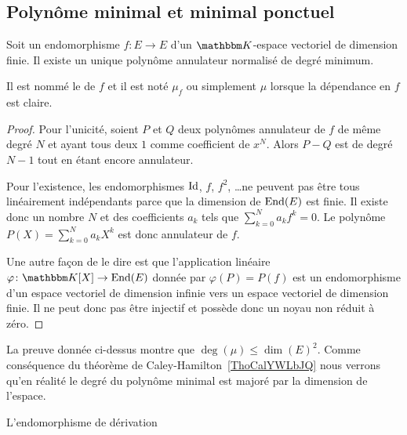 \subsection{Polynôme minimal et minimal ponctuel}

\begin{lemmaDef}        \label{DefooOHUXooNkPWaB}
    Soit un endomorphisme \( f\colon E\to E\) d'un \( \eK\)-espace vectoriel de dimension finie. Il existe un unique polynôme annulateur normalisé de degré minimum.

    Il est nommé le  de \( f\) et il est noté \( \mu_f\) ou simplement \( \mu\) lorsque la dépendance en \( f\) est claire.
\end{lemmaDef}

\begin{proof}
    Pour l'unicité, soient \( P\) et \( Q\) deux polynômes annulateur de \( f\) de même degré \( N\) et ayant tous deux \( 1\) comme coefficient de \( x^N\). Alors \( P-Q\) est de degré \( N-1\) tout en étant encore annulateur.

    Pour l'existence, les endomorphismes \( \operatorname{Id}\), \( f\), \( f^2\), \ldots ne peuvent pas être tous linéairement indépendants parce que la dimension de \( \operatorname{End}(E)\) est finie. Il existe donc un nombre \( N\) et des coefficients \( a_k\) tels que \( \sum_{k=0}^Na_kf^k=0\). Le polynôme \( P(X)=\sum_{k=0}^Na_kX^k\) est donc annulateur de \( f\).

    Une autre façon de le dire est que l'application linéaire \( \varphi\colon \eK[X]\to \End(E)\) donnée par \( \varphi(P)=P(f)\) est un endomorphisme d'un espace vectoriel de dimension infinie vers un espace vectoriel de dimension finie. Il ne peut donc pas être injectif et possède donc un noyau non réduit à zéro.
\end{proof}

\begin{remark}
    La preuve donnée ci-dessus montre que \( \deg(\mu)\leq \dim(E)^2\). Comme conséquence du théorème de Caley-Hamilton~\ref{ThoCalYWLbJQ} nous verrons qu'en réalité le degré du polynôme minimal est majoré par la dimension de l'espace.
\end{remark}

\begin{example}
    L'endomorphisme de dérivation
\end{example}


